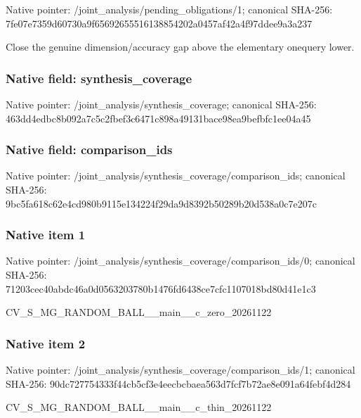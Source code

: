 \documentclass[10pt,a4paper]{article}
\begin{document}
Native pointer: /joint\_analysis/pending\_obligations/1; canonical SHA-256: 7fe07e7359d60730a9f65692\allowbreak{}655516138854202a0457af42\allowbreak{}a4f97ddee9a3a237


Close the genuine dimension/accuracy gap above the elementary onequery lower.


\subsubsection{Native field: synthesis\_coverage}


Native pointer: /joint\_analysis/synthesis\_coverage; canonical SHA-256: 463dd4edbc8b092a7c5c2fbe\allowbreak{}f3c6471c898a49131bace98e\allowbreak{}a9befbfc1ee04a45



\subsubsection{Native field: comparison\_ids}


Native pointer: /joint\_analysis/synthesi\allowbreak{}s\_coverage/comparison\_id\allowbreak{}s; canonical SHA-256: 9bc5fa618c62e4cd980b9115\allowbreak{}e134224f29da9d8392b50289\allowbreak{}b20d538a0c7e207c



\subsubsection{Native item 1}


Native pointer: /joint\_analysis/synthesi\allowbreak{}s\_coverage/comparison\_id\allowbreak{}s/0; canonical SHA-256: 71203cec40abdc46a0d05632\allowbreak{}03780b1476fd6438ce7cfc11\allowbreak{}07018bd80d41e1c3


CV\_S\_MG\_RANDOM\_BALL\_\_mai\allowbreak{}n\_\_c\_zero\_20261122


\subsubsection{Native item 2}


Native pointer: /joint\_analysis/synthesi\allowbreak{}s\_coverage/comparison\_id\allowbreak{}s/1; canonical SHA-256: 90dc727754333f44cb5cf3e4\allowbreak{}eecbcbaea563d7fcf7b72ae8\allowbreak{}e091a64febf4d284


CV\_S\_MG\_RANDOM\_BALL\_\_mai\allowbreak{}n\_\_c\_thin\_20261122
\end{document}
